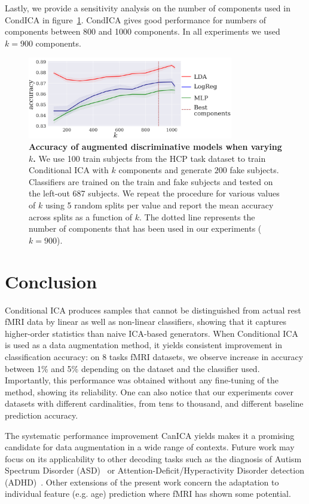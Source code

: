 Lastly, we provide a sensitivity analysis on the number of components used in
CondICA in figure~\ref{condica:sensitivity:fig}.
CondICA gives good performance for numbers of components between 800 and 1000
components. In all experiments we used $k=900$ components.

\begin{figure}
  \centerline{\includegraphics[width=0.8\textwidth]{figures/condica/sensitivity.pdf}}
  \caption{\textbf{Accuracy of augmented discriminative models when
      varying $k$.} We use 100 train subjects from the HCP task dataset to train Conditional ICA with $k$ components and generate $200$ fake subjects.
    Classifiers are trained on the train and fake subjects and tested on the
    left-out 687 subjects. We repeat the procedure
    for various values of $k$ using 5 random splits per value and
    report the mean accuracy across splits as a function of $k$.
    The dotted line represents the number of components that has been
    used in our experiments ($k=900$).
  }
  \label{condica:sensitivity:fig}
\end{figure}






\section{Conclusion}
Conditional ICA produces samples that cannot be distinguished from actual rest fMRI data by linear as well as non-linear classifiers, showing that it captures higher-order statistics than naive ICA-based generators.
%
When Conditional ICA is used as a data augmentation method, it yields consistent
improvement in classification accuracy: on 8 tasks fMRI datasets, we observe
increase in accuracy between 1\% and 5\% depending on the dataset and the
classifier used.
Importantly, this performance was obtained without any fine-tuning of
the method, showing its reliability. One can also notice that our experiments cover datasets with different cardinalities, from tens to thousand, and different baseline prediction accuracy.

The systematic performance improvement CanICA yields
makes it a promising candidate for data augmentation in a wide range of
contexts. Future work may focus on its applicability to other decoding tasks
such as the diagnosis of Autism Spectrum Disorder
(ASD)~\cite{eslami2019asd,eslami2019auto,dvornek2017identifying} or
Attention-Deficit/Hyperactivity Disorder detection (ADHD)~\cite{mao2019spatio}. Other extensions of the present work concern the adaptation to
individual feature (e.g. age) prediction where
fMRI has shown some potential.
%
